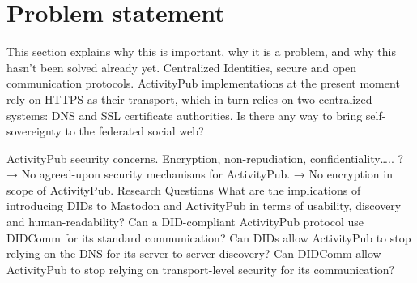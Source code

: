 


 
\section{Problem statement}
 
This section explains why this is important, why it is a problem, and why this hasn't been solved already yet. Centralized Identities, secure and open communication protocols. 
ActivityPub implementations at the present moment rely on HTTPS as their transport, which in turn relies on two centralized systems: DNS and SSL certificate authorities. Is there any way to bring self-sovereignty to the federated social web? \cite{webber_sporny_2017}
 
ActivityPub security concerns. Encryption, non-repudiation, confidentiality….. ? 
→ No agreed-upon security mechanisms for ActivityPub. 
→ No encryption in scope of ActivityPub.
Research Questions
What are the implications of introducing DIDs to Mastodon and ActivityPub in terms of usability, discovery and human-readability?
Can a DID-compliant ActivityPub protocol use DIDComm for its standard communication?
Can DIDs allow ActivityPub to stop relying on the DNS for its server-to-server discovery?
Can DIDComm allow ActivityPub to stop relying on transport-level security for its communication?

